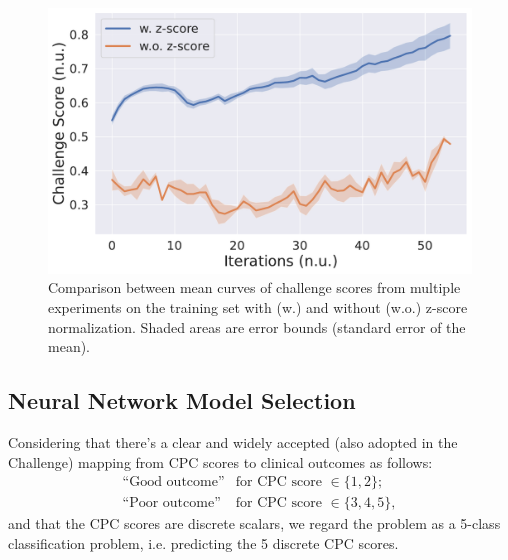 \begin{figure}[!htp]
\centering
\includegraphics[width=0.95\linewidth]{images/train_scores_compare.pdf}
\caption[]{Comparison between mean curves of challenge scores from multiple experiments on the training set with (w.) and without (w.o.) z-score normalization. Shaded areas are error bounds (standard error of the mean).}
\label{fig:train_scores_compare}
\end{figure}

\subsection{Neural Network Model Selection}
\label{subsec:models}

Considering that there's a clear and widely accepted (also adopted in the Challenge) mapping from CPC scores to clinical outcomes as follows:
\begin{equation}
\label{eq:cpc_outcome_mapping}
\begin{array}{cl}
\text{``Good outcome''} & \text{for CPC score } \in \{1, 2\}; \\
\text{``Poor outcome''} & \text{for CPC score } \in \{3, 4, 5\},
\end{array}
\end{equation}
and that the CPC scores are discrete scalars, we regard the problem as a 5-class classification problem, i.e. predicting the 5 discrete CPC scores.

